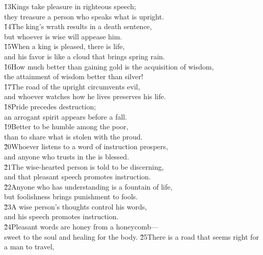 \begin{poetry}
\poeml \v{13}Kings take pleasure in righteous speech; \\
\poemll    they treasure a person who speaks what is upright. \\
\poeml \v{14}The king's wrath results in a death sentence, \\
\poemll    but whoever is wise will appease him. \\
\poeml \v{15}When a king is pleased, there is life, \\
\poemll    and his favor is like a cloud that brings spring rain. \\
\poeml \v{16}How much better than gaining gold is the acquisition of wisdom, \\
\poemll    the attainment of wisdom better than silver! \\
\poeml \v{17}The road of the upright circumvents evil, \\
\poemll    and whoever watches how he lives preserves his life. \\
\poeml \v{18}Pride precedes destruction; \\
\poemll    an arrogant spirit appears before a fall. \\
\poeml \v{19}Better to be humble among the poor, \\
\poemll    than to share what is stolen with the proud. \\
\poeml \v{20}Whoever listens to a word of instruction prospers, \\
\poemll    and anyone who trusts in the  is blessed. \\
\poeml \v{21}The wise-hearted person is told to be discerning, \\
\poemll    and that pleasant speech promotes instruction. \\
\poeml \v{22}Anyone who has understanding is a fountain of life, \\
\poemll    but foolishness brings punishment to fools. \\
\poeml \v{23}A wise person's thoughts control his words, \\
\poemll    and his speech promotes instruction. \\
\poeml \v{24}Pleasant words are honey from a honeycomb--- \\
\poemll    sweet to the soul and healing for the body.
\poeml \v{25}There is a road that seems right for a man to travel, \\

\end{poetry}
